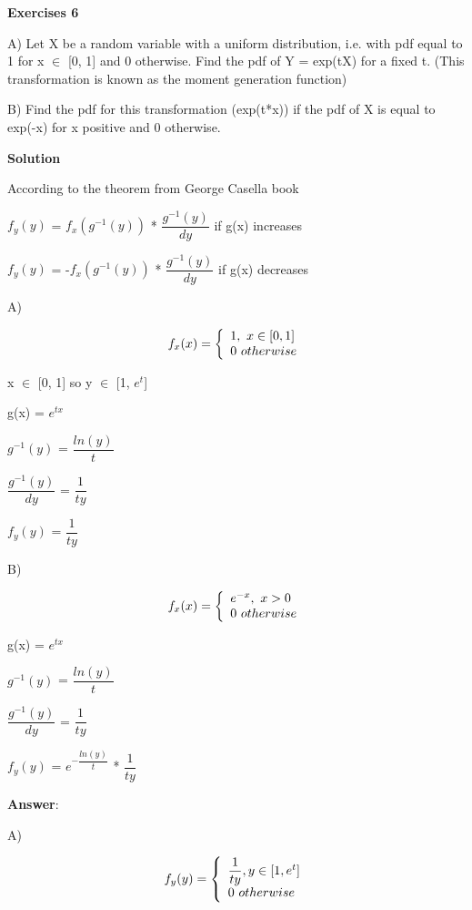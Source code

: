 \documentclass[12pt]{article}
\theoremstyle{definiton}
\theoremstyle{definition}
\theoremstyle{definition}
\begin{document}
		\bigskip

		
		\textbf{Exercises 6}

A)  Let X be a random variable with a uniform distribution, i.e. with pdf equal to 1 for
x $\in$ [0, 1] and 0 otherwise. Find the pdf of Y = exp(tX) for a fixed t. (This transformation is known as the moment generation function)

B) Find the pdf for this transformation (exp(t*x)) if the pdf of X is equal to exp(-x) for x positive and 0 otherwise.
		
		\medskip
		
		\textbf{Solution}
		
According to the theorem from George Casella book
\medskip

$f_y(y)$ = $f_x(g^{-1}(y))$ * $\dfrac{g^{-1}(y)}{dy}$ if g(x) increases
\medskip

$f_y(y)$ = -$f_x(g^{-1}(y))$ * $\dfrac{g^{-1}(y)}{dy}$ if g(x) decreases
\medskip

A) 
\medskip

\[f_x(x) = \left\{
\begin{array}{l l}
  1,\ x \in [0, 1]\\
  0\ otherwise
\end{array} \right.\]
\medskip

x $\in$ [0, 1] so 
y $\in$ [1, $e^t$]
\medskip

g(x) = $e^{tx}$	
\medskip

$g^{-1}(y)$ = $\dfrac{ln(y)}{t}$
\medskip

$\dfrac{g^{-1}(y)}{dy}$ = $\dfrac{1}{ty}$
\medskip

$f_y(y)$ = $\dfrac{1}{ty}$
\medskip

B)
\medskip

\[f_x(x) = \left\{
\begin{array}{l l}
  e^{-x},\ x > 0\\
  0\ otherwise
\end{array} \right.\]
\medskip

g(x) = $e^{tx}$	
\medskip

$g^{-1}(y)$ = $\dfrac{ln(y)}{t}$
\medskip

$\dfrac{g^{-1}(y)}{dy}$ = $\dfrac{1}{ty}$
\medskip

$f_y(y)$ = $e^{-\dfrac{ln(y)}{t}}$ * $\dfrac{1}{ty}$
\medskip


		\medskip
		\textbf{Answer}:

A)
\medskip

\[f_y(y) = \left\{
\begin{array}{l l}
  \dfrac{1}{ty}, y \in [1, e^t]\\
  0\ otherwise
\end{array} \right.\]
\end{document}

